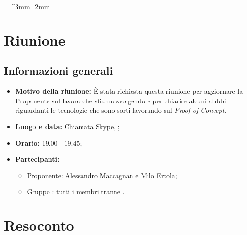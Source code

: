 \documentclass[VER-2018-01-09.tex]{subfiles}
\begin{document}
\tabulinesep = ^3mm_2mm
\chapter{Riunione}
\section{Informazioni generali}
\begin{itemize}
	\item \textbf{Motivo della riunione:} \`{E} stata richiesta questa riunione per aggiornare la Proponente sul lavoro che stiamo svolgendo e per chiarire alcuni dubbi riguardanti le tecnologie che sono sorti lavorando sul \textit{Proof of Concept}.
	\item \textbf{Luogo e data:} Chiamata Skype, ;
	\item \textbf{Orario:} 19.00 - 19.45;
	\item \textbf{Partecipanti:}
	\begin{itemize}
		\item Proponente: Alessandro Maccagnan e Milo Ertola;
		\item Gruppo \gruppo: tutti i membri tranne \Gianluca.
	\end{itemize}
\end{itemize}

\chapter{Resoconto}
\end{document}
